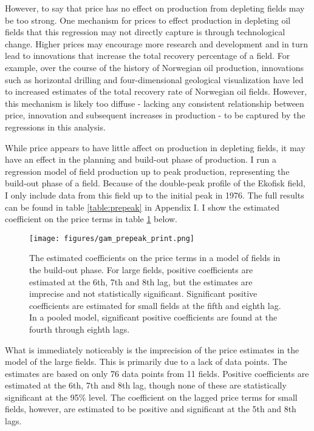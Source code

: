 \documentclass[12pt]{article}
\begin{document}
However, to say that price has no effect on production from depleting fields may be too strong. One mechanism for prices to effect production in depleting oil fields that this regression may not directly capture is through technological change.  Higher prices may encourage more research and development and in turn lead to innovations that increase the total recovery percentage of a field.  For example, over the course of the history of Norwegian oil production, innovations such as horizontal drilling and four-dimensional geological visualization have led to increased estimates of the total recovery rate of Norwegian oil fields.  However, this mechanism is likely too diffuse - lacking any consistent relationship between price, innovation and subsequent increases in production - to be captured by the regressions in this analysis. 

While price appears to have little affect on production in depleting fields, it may have an effect in the planning and build-out phase of production. I run a regression model of field production up to peak production, representing the build-out phase of a field.  Because of the double-peak profile of the Ekofisk field, I only include data from this field up to the initial peak in 1976.  The full results can be found in table \ref{table:prepeak} in Appendix I.  I show the estimated coefficient on the price terms in table \ref{gam_prepeak_print} below.  

\begin{figure}
	\texttt{[image: figures/gam\_prepeak\_print.png]}
	\caption{The estimated coefficients on the price terms in a model of fields in the build-out phase.  For large fields, positive coefficients are estimated at the 6th, 7th and 8th lag, but the estimates are imprecise and not statistically significant.  Significant positive coefficients are estimated for small fields at the fifth and eighth lag.  In a pooled model, significant positive coefficients are found at the fourth through eighth lags.}
	\label{gam_prepeak_print}
\end{figure}

What is immediately noticeably is the imprecision of the price estimates in the model of the large fields.  This is primarily due to a lack of data points.  The estimates are based on only 76 data points from 11 fields.  Positive coefficients are estimated at the 6th, 7th and 8th lag, though none of these are statistically significant at the 95\% level.  The coefficient on the lagged price terms for small fields, however, are estimated to be positive and significant at the 5th and 8th lags.  
\end{document}
